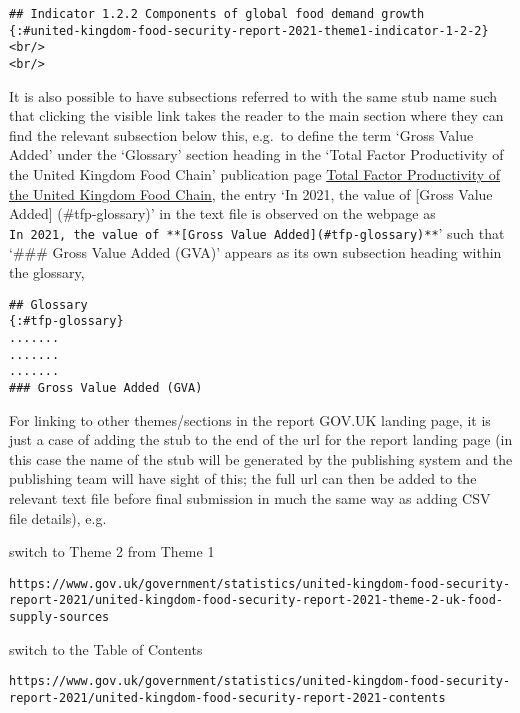\documentclass[
]{book}
\begin{document}
\begin{verbatim}
## Indicator 1.2.2 Components of global food demand growth 
{:#united-kingdom-food-security-report-2021-theme1-indicator-1-2-2}
<br/>
<br/>
\end{verbatim}

It is also possible to have subsections referred to with the same stub name such that clicking the visible link takes the reader to the main section where they can find the relevant subsection below this, e.g.~to define the term `Gross Value Added' under the `Glossary' section heading in the `Total Factor Productivity of the United Kingdom Food Chain' publication page \href{https://www.gov.uk/government/statistics/food-chain-productivity/total-factor-productivity-of-the-united-kingdom-food-chain-2021-final-release}{Total Factor Productivity of the United Kingdom Food Chain}, the entry `In 2021, the value of {[}Gross Value Added{]} (\#tfp-glossary)' in the text file is observed on the webpage as \texttt{\textquotesingle{}In\ 2021,\ the\ value\ of\ **{[}Gross\ Value\ Added{]}(\#tfp-glossary)**}' such that `\#\#\# Gross Value Added (GVA)' appears as its own subsection heading within the glossary,

\begin{verbatim}
## Glossary
{:#tfp-glossary} 
.......
.......
.......
### Gross Value Added (GVA)
\end{verbatim}

For linking to other themes/sections in the report GOV.UK landing page, it is just a case of adding the stub to the end of the url for the report landing page (in this case the name of the stub will be generated by the publishing system and the publishing team will have sight of this; the full url can then be added to the relevant text file before final submission in much the same way as adding CSV file details), e.g.

switch to Theme 2 from Theme 1

\begin{verbatim}
https://www.gov.uk/government/statistics/united-kingdom-food-security-report-2021/united-kingdom-food-security-report-2021-theme-2-uk-food-supply-sources
\end{verbatim}

switch to the Table of Contents

\begin{verbatim}
https://www.gov.uk/government/statistics/united-kingdom-food-security-report-2021/united-kingdom-food-security-report-2021-contents
\end{verbatim}
\end{document}

